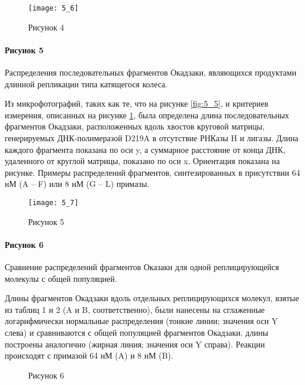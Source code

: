 \begin{figure}[h]
    \centering
    \texttt{[image: 5\_6]}
    \caption{Рисунок 4}
    \label{fig:5_6}
\end{figure}

\paragraph{Рисунок 5}

Распределения последовательных фрагментов Окадзаки, являющихся продуктами длинной репликации типа катящегося колеса. 

Из микрофотографий, таких как те, что на рисунке \ref{fig:5_5}, и критериев измерения, описанных на рисунке \ref{fig:5_6}, была определена длина последовательных фрагментов Окадзаки, расположенных вдоль хвостов круговой матрицы, генерируемых ДНК-полимеразой D219A в отсутствие РНКазы H и лигазы.  Длина каждого фрагмента показана по оси y, а суммарное расстояние от конца ДНК, удаленного от круглой матрицы, показано по оси x.  Ориентация показана на рисунке.  Примеры распределений фрагментов, синтезированных в присутствии 64 нМ (A – F) или 8 нМ (G – L) примазы.
\begin{figure}[H]
\centering
    \texttt{[image: 5\_7]}
    \caption{Рисунок 5}
    \label{fig:5_7}
\end{figure}

\paragraph{Рисунок 6} Сравнение распределений фрагментов Оказаки для одной реплицирующейся молекулы с общей популяцией. 

Длины фрагментов Окадзаки вдоль отдельных реплицирующихся молекул, взятые из таблиц 1 и 2 (A и B, соответственно), были нанесены на сглаженные логарифмически нормальные распределения (тонкие линии; значения оси Y слева) и сравниваются с общей популяцией фрагментов Окадзаки.  длины построены аналогично (жирная линия; значения оси Y справа).  Реакции происходят с примазой 64 нМ (A) и 8 нМ (B).

\begin{figure}[H]
\begin{minipage}[h]{0.49\linewidth}
\center{\texttt{[image: 5\_8]} }
\end{minipage}
\hfill
\begin{minipage}[h]{0.49\linewidth}
\center{\texttt{[image: 5\_9]} }
\end{minipage}
\caption{Рисунок 6}
\label{fig:5_89}
\end{figure}

\newpage